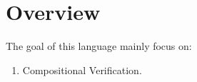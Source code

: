 \section{Overview}


The goal of this language \lang{} mainly focus on:

\begin{enumerate}
    \item Compositional Verification.
\end{enumerate}